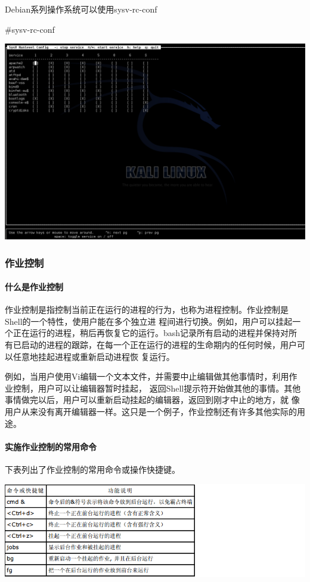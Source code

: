 \documentclass[letterpaper,10pt]{sphinxmanual}
\begin{document}
Debian系列操作系统可以使用sysv-rc-conf

\#sysv-rc-conf

\includegraphics{sysv-rc-conf.png}


\subsubsection{作业控制}
\label{Linux_pro_mana/process:id17}

\paragraph{什么是作业控制}
\label{Linux_pro_mana/process:id18}
作业控制是指控制当前正在运行的进程的行为，也称为进程控制。作业控制是Shell的一个特性，使用户能在多个独立进
程间进行切换。例如，用户可以挂起一个正在运行的进程，稍后再恢复它的运行。bash记录所有启动的进程并保持对所
有已启动的进程的跟踪，在每一个正在运行的进程的生命期内的任何时候，用户可以任意地挂起进程或重新启动进程恢
复运行。

例如，当用户使用Vi编辑一个文本文件，并需要中止编辑做其他事情时，利用作业控制，用户可以让编辑器暂时挂起，
返回Shell提示符开始做其他的事情。其他事情做完以后，用户可以重新启动挂起的编辑器，返回到刚才中止的地方，就
像用户从来没有离开编辑器一样。这只是一个例子，作业控制还有许多其他实际的用途。


\paragraph{实施作业控制的常用命令}
\label{Linux_pro_mana/process:id19}
下表列出了作业控制的常用命令或操作快捷键。

\includegraphics{job1.png}
\end{document}
